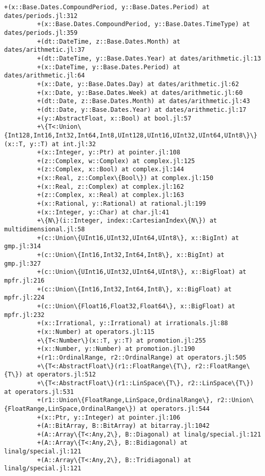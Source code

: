 \documentclass[11pt]{article}
\begin{document}
\begin{Verbatim}[commandchars=\\\{\}]
         +(x::Base.Dates.CompoundPeriod, y::Base.Dates.Period) at dates/periods.jl:312
         +(x::Base.Dates.CompoundPeriod, y::Base.Dates.TimeType) at dates/periods.jl:359
         +(dt::DateTime, z::Base.Dates.Month) at dates/arithmetic.jl:37
         +(dt::DateTime, y::Base.Dates.Year) at dates/arithmetic.jl:13
         +(x::DateTime, y::Base.Dates.Period) at dates/arithmetic.jl:64
         +(x::Date, y::Base.Dates.Day) at dates/arithmetic.jl:62
         +(x::Date, y::Base.Dates.Week) at dates/arithmetic.jl:60
         +(dt::Date, z::Base.Dates.Month) at dates/arithmetic.jl:43
         +(dt::Date, y::Base.Dates.Year) at dates/arithmetic.jl:17
         +(y::AbstractFloat, x::Bool) at bool.jl:57
         +\{T<:Union\{Int128,Int16,Int32,Int64,Int8,UInt128,UInt16,UInt32,UInt64,UInt8\}\}(x::T, y::T) at int.jl:32
         +(x::Integer, y::Ptr) at pointer.jl:108
         +(z::Complex, w::Complex) at complex.jl:125
         +(z::Complex, x::Bool) at complex.jl:144
         +(x::Real, z::Complex\{Bool\}) at complex.jl:150
         +(x::Real, z::Complex) at complex.jl:162
         +(z::Complex, x::Real) at complex.jl:163
         +(x::Rational, y::Rational) at rational.jl:199
         +(x::Integer, y::Char) at char.jl:41
         +\{N\}(i::Integer, index::CartesianIndex\{N\}) at multidimensional.jl:58
         +(c::Union\{UInt16,UInt32,UInt64,UInt8\}, x::BigInt) at gmp.jl:314
         +(c::Union\{Int16,Int32,Int64,Int8\}, x::BigInt) at gmp.jl:327
         +(c::Union\{UInt16,UInt32,UInt64,UInt8\}, x::BigFloat) at mpfr.jl:216
         +(c::Union\{Int16,Int32,Int64,Int8\}, x::BigFloat) at mpfr.jl:224
         +(c::Union\{Float16,Float32,Float64\}, x::BigFloat) at mpfr.jl:232
         +(x::Irrational, y::Irrational) at irrationals.jl:88
         +(x::Number) at operators.jl:115
         +\{T<:Number\}(x::T, y::T) at promotion.jl:255
         +(x::Number, y::Number) at promotion.jl:190
         +(r1::OrdinalRange, r2::OrdinalRange) at operators.jl:505
         +\{T<:AbstractFloat\}(r1::FloatRange\{T\}, r2::FloatRange\{T\}) at operators.jl:512
         +\{T<:AbstractFloat\}(r1::LinSpace\{T\}, r2::LinSpace\{T\}) at operators.jl:531
         +(r1::Union\{FloatRange,LinSpace,OrdinalRange\}, r2::Union\{FloatRange,LinSpace,OrdinalRange\}) at operators.jl:544
         +(x::Ptr, y::Integer) at pointer.jl:106
         +(A::BitArray, B::BitArray) at bitarray.jl:1042
         +(A::Array\{T<:Any,2\}, B::Diagonal) at linalg/special.jl:121
         +(A::Array\{T<:Any,2\}, B::Bidiagonal) at linalg/special.jl:121
         +(A::Array\{T<:Any,2\}, B::Tridiagonal) at linalg/special.jl:121

\end{Verbatim}
\end{document}
